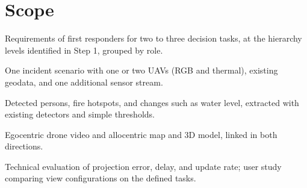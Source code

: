 \documentclass{article}
\begin{document}
\section{Scope}

\begin{description}[style=nextline]
  \item[Requirements] Requirements of first responders for two to three decision tasks, at the hierarchy levels identified in Step 1, grouped by role.
  \item[Set-up] One incident scenario with one or two UAVs (RGB and thermal), existing geodata, and one additional sensor stream.
  \item[Events] Detected persons, fire hotspots, and changes such as water level, extracted with existing detectors and simple thresholds.
  \item[Views] Egocentric drone video and allocentric map and 3D model, linked in both directions.
  \item[Evaluation] Technical evaluation of projection error, delay, and update rate; user study comparing view configurations on the defined tasks.
\end{description}
\end{document}
